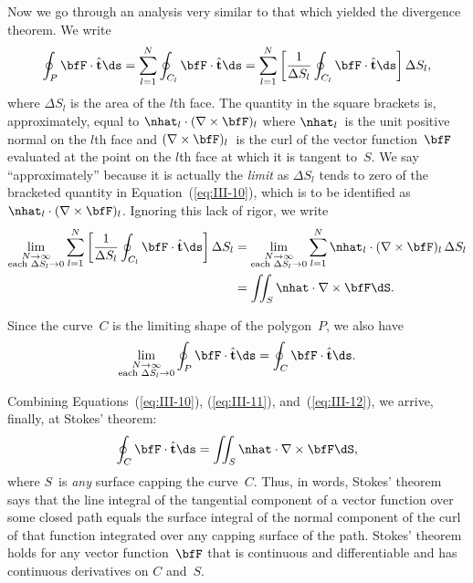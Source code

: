 Now we go through an analysis very similar to that which yielded the
divergence theorem.  We write
\begin{equation}
  \oint_P\bfF\cdot\hat{\mathbf{t}}\ds
  = \sum_{l=1}^{N}\oint_{C_l}\bfF\cdot\hat{\mathbf{t}}\ds
  = \sum_{l=1}^{N}\left[\frac{1}{\Delta S_l}
    \oint_{C_l}\bfF\cdot\hat{\mathbf{t}}\ds\right]\Delta S_l,
  \label{eq:III-10}
\end{equation}
where $\Delta S_l$ is the area of the $l$th face.  The quantity in the
square brackets is, approximately, equal to
$\nhat_l\cdot(\nabla\times\bfF)_l$ where $\nhat_l$~is the unit
positive normal on the $l$th face and $(\nabla\times\bfF)_l$~is the
curl of the vector function~$\bfF$ evaluated at the point on the $l$th
face at which it is tangent to~$S$.  We say ``approximately'' because it
is actually the \emph{limit} as $\Delta S_l$ tends to zero of the
bracketed quantity in Equation~(\ref{eq:III-10}), which is to be
identified as $\nhat_l\cdot(\nabla\times\bfF)_l$.  Ignoring this lack
of rigor, we write
\begin{align}
  \lim_{\substack{N\to\infty\\ \text{each }\Delta S_l\to 0}}
  \sum_{l=1}^{N}\left[\frac{1}{\Delta S_l}
    \oint_{C_l}\bfF\cdot\hat{\mathbf{t}}\ds\right]\Delta S_l
  &= \lim_{\substack{N\to\infty\\ \text{each }\Delta S_l\to 0}}
     \sum_{l=1}^{N}\nhat_l\cdot(\nabla\times\bfF)_l\,\Delta S_l
     \notag\\
  &= \iint_S \nhat\cdot\nabla\times\bfF\dS.
  \label{eq:III-11}
\end{align}

Since the curve~$C$ is the limiting shape of the polygon~$P$, we also
have
\begin{equation}
  \lim_{\substack{N\to\infty\\ \text{each }\Delta S_l\to 0}}
  \oint_P\bfF\cdot\hat{\mathbf{t}}\ds
  = \oint_C\bfF\cdot\hat{\mathbf{t}}\ds.
  \label{eq:III-12}
\end{equation}

Combining Equations~(\ref{eq:III-10}), (\ref{eq:III-11}),
and~(\ref{eq:III-12}), we arrive, finally, at Stokes' theorem:
\begin{equation}
  \oint_C\bfF\cdot\hat{\mathbf{t}}\ds
  = \iint_S \nhat\cdot\nabla\times\bfF\dS,
  \label{eq:III-13}
\end{equation}
where $S$~is \emph{any} surface capping the curve~$C$.  Thus, in words,
Stokes' theorem says that the line integral of the tangential component
of a vector function over some closed path equals the surface integral
of the normal component of the curl of that function integrated over
any capping surface of the path.  Stokes' theorem holds for any vector
function~$\bfF$ that is continuous and differentiable and has continuous
derivatives on $C$ and~$S$.

